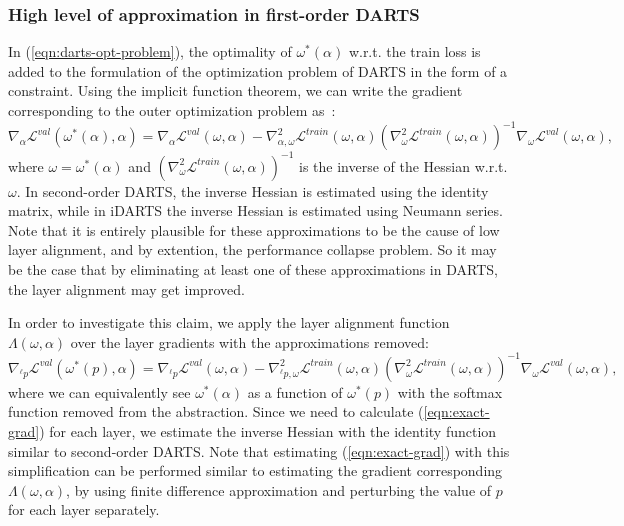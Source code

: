 \documentclass{article} \usepackage{fancyhdr, iclr2023_conference, times}
\newcommand{\lambdafn}{layer alignment\xspace}
\begin{document}
\subsubsection{High level of approximation in first-order DARTS}
\par In (\ref{eqn:darts-opt-problem}), the optimality of $\omega^*(\alpha)$ w.r.t. the train loss is added to the formulation of the optimization problem of DARTS in the form of a constraint. Using the implicit function theorem, we can write the gradient corresponding to the outer optimization problem as~\citep{DBLP:conf/icml/ZhangSPCAH21}:
\begin{equation}
    \nabla_\alpha \mathcal{L}^{val}(\omega^*(\alpha), \alpha)=\nabla_\alpha \mathcal{L}^{val}(\omega, \alpha)-\nabla_{\alpha, \omega}^2\mathcal{L}^{train}(\omega, \alpha)\left(\nabla_\omega^2 \mathcal{L}^{train}(\omega, \alpha)\right)^{-1}\nabla_\omega \mathcal{L}^{val}(\omega, \alpha)\text{,}
\end{equation}
where $\omega=\omega^*(\alpha)$ and $\left(\nabla_\omega^2 \mathcal{L}^{train}(\omega, \alpha)\right)^{-1}$ is the inverse of the Hessian w.r.t. $\omega$. In second-order DARTS, the inverse Hessian is estimated using the identity matrix, while in iDARTS the inverse Hessian is estimated using Neumann series. Note that it is entirely plausible for these approximations to be the cause of low \lambdafn, and by extention, the performance collapse problem. So it may be the case that by eliminating at least one of these approximations in DARTS, the \lambdafn may get improved. 
\par In order to investigate this claim, we apply the \lambdafn function $\Lambda(\omega, \alpha)$ over the layer gradients with the approximations removed:
\begin{equation}
    \label{eqn:exact-grad}
    \nabla_{{}^\ell p} \mathcal{L}^{val}(\omega^*(p), \alpha)=\nabla_{{}^\ell p} \mathcal{L}^{val}(\omega, \alpha)-\nabla_{{}^\ell p, \omega}^2\mathcal{L}^{train}(\omega, \alpha)\left(\nabla_\omega^2 \mathcal{L}^{train}(\omega, \alpha)\right)^{-1}\nabla_\omega \mathcal{L}^{val}(\omega, \alpha)\text{,}
\end{equation}
where we can equivalently see $\omega^*(\alpha)$ as a function of $\omega^*(p)$ with the softmax function removed from the abstraction. Since we need to calculate (\ref{eqn:exact-grad}) for each layer, we estimate the inverse Hessian with the identity function similar to second-order DARTS. Note that estimating (\ref{eqn:exact-grad}) with this simplification can be performed similar to estimating the gradient corresponding $\Lambda(\omega, \alpha)$, by using finite difference approximation and perturbing the value of $p$ for each layer separately.
\end{document}
